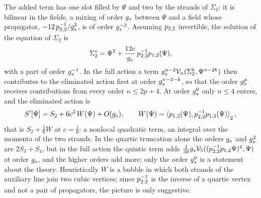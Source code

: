 The added term has one slot filled by $\Psi$ and two by the strands of $\Sigma_2$: it is bilinear in the fields, a mixing of order $\gs$ between $\Psi$ and a field whose propagator, $- 12 \, \sprod{2}{2}^{-1} / \gs^2$, is of order $\gs^{-2}$.
Assuming $\sprod{2}{2}$ invertible, the solution of the equation of $\Sigma_2$ is
\begin{equation}
  \Sigma_2^*
    = \Psi^2 + \frac{12 c}{\gs} \, \sprod{2}{2}^{-1} \sprod{1}{2}(\Psi),
\end{equation}
with a part of order $\gs^{-1}$.
In the full action a term $\gs^{n - 2} \vertex{n}(\Sigma_2^k, \Psi^{n - 2 k})$ then contributes to the eliminated action first at order $\gs^{n - 2 - k}$, so that the order $\gs^p$ receives contributions from every order $n \le 2 p + 4$.
At order $\gs^0$ only $n \le 4$ enters, and the eliminated action is
\begin{equation}
  S'[\Psi]
    = S_2 + 6 c^2 \, W(\Psi) + O(\gs),
  \qquad
  W(\Psi)
    = \pair[2]{\sprod{1}{2}(\Psi)}{\sprod{2}{2}^{-1} \sprod{1}{2}(\Psi)},
\end{equation}
that is $S_2 + \tfrac{1}{6} W$ at $c = \tfrac{1}{6}$: a nonlocal quadratic term, an integral over the momenta of the two strands.
In the quartic truncation alone the orders $\gs$ and $\gs^2$ are $2 S_3 + S_4$, but in the full action the quintic term adds $\tfrac{1}{30} \gs \vertex{5}((\sprod{2}{2}^{-1} \sprod{1}{2} \Psi)^2, \Psi)$ at order $\gs$, and the higher orders add more; only the order $\gs^0$ is a statement about the theory.
Heuristically $W$ is a bubble in which both strands of the auxiliary line join two cubic vertices; since $\sprod{2}{2}^{-1}$ is the inverse of a quartic vertex and not a pair of propagators, the picture is only suggestive.

